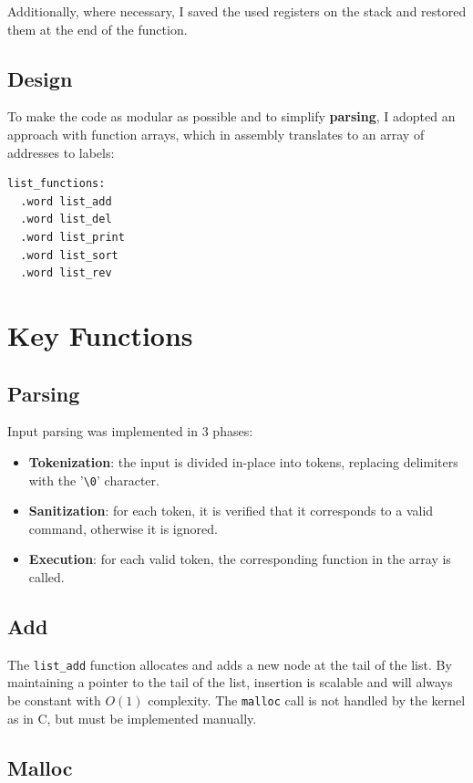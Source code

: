 \documentclass[a4paper,12pt]{article}
\begin{document}
Additionally, where necessary, I saved the used registers on the stack and restored them at the end of the function.

\subsection{Design}

To make the code as modular as possible and to simplify \textbf{parsing}, I adopted an approach with function arrays, which in assembly translates to an array of addresses to labels:

\begin{lstlisting}[language=riscv]
list_functions:
  .word list_add
  .word list_del
  .word list_print
  .word list_sort
  .word list_rev
\end{lstlisting}

\section{Key Functions}

\subsection{Parsing}

Input parsing was implemented in 3 phases:
\begin{itemize}
    \item \textbf{Tokenization}: the input is divided in-place into tokens, replacing delimiters with the '\texttt{\textbackslash0}' character.
    \item \textbf{Sanitization}: for each token, it is verified that it corresponds to a valid command, otherwise it is ignored.
    \item \textbf{Execution}: for each valid token, the corresponding function in the array is called.
\end{itemize}

\subsection{Add}

The \texttt{list\_add} function allocates and adds a new node at the tail of the list.
By maintaining a pointer to the tail of the list, insertion is scalable and will always be constant with $O(1)$ complexity.
The \texttt{malloc} call is not handled by the kernel as in C, but must be implemented manually.

\subsection{Malloc}
\end{document}
